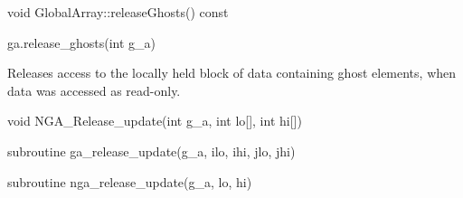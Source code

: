 \documentclass[12pt]{article}
\begin{document}
\begin{cxxapi}
\begin{cxxcode}
void GlobalArray::releaseGhosts() const
\end{cxxcode}
\end{cxxapi}

\begin{pyapi}
\begin{pycode}
ga.release_ghosts(int g_a)
\end{pycode}
\begin{funcargs}
\end{funcargs}
\end{pyapi}

\local

\begin{desc}

Releases access to the locally held block of data containing ghost elements,
when data was accessed as read-only.

\end{desc}



\begin{capi}
\begin{ccode}
void NGA_Release_update(int g_a, int lo[], int hi[])
\end{ccode}
\begin{funcargs}
\end{funcargs}
\end{capi}

\begin{f2dapi}
\begin{fcode}
subroutine ga_release_update(g_a, ilo, ihi, jlo, jhi)
\end{fcode}
\begin{funcargs}
\end{funcargs}
\end{f2dapi}

\begin{fapi}
\begin{fcode}
subroutine nga_release_update(g_a, lo, hi)
\end{fcode}
\begin{funcargs}
\end{funcargs}
\end{fapi}
\end{document}
